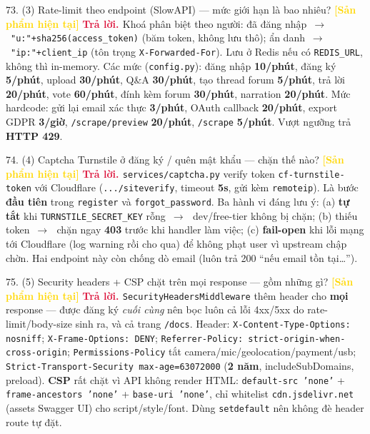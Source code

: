 \documentclass[11pt]{article}
\newcommand{\arr}{\,\ensuremath{\rightarrow}\,}
\newcommand{\tagSP}{\textcolor{gold}{\footnotesize\textbf{[Sản phẩm hiện tại]}}}
\newcommand{\A}{\textbf{\textcolor{crimson}{Trả lời. }}}
\begin{document}
\begin{qa}{73. (3) Rate-limit theo endpoint (SlowAPI) --- mức giới hạn là bao nhiêu? \tagSP}
\A Khoá phân biệt theo người: đã đăng nhập \arr\ \texttt{"u:"+sha256(access\_token)} (băm token, không lưu thô); ẩn danh \arr\ \texttt{"ip:"+client\_ip} (tôn trọng \texttt{X-Forwarded-For}). Lưu ở Redis nếu có \texttt{REDIS\_URL}, không thì in-memory. Các mức (\texttt{config.py}): đăng nhập \textbf{10/phút}, đăng ký \textbf{5/phút}, upload \textbf{30/phút}, Q\&A \textbf{30/phút}, tạo thread forum \textbf{5/phút}, trả lời \textbf{20/phút}, vote \textbf{60/phút}, đính kèm forum \textbf{30/phút}, narration \textbf{20/phút}. Mức hardcode: gửi lại email xác thực \textbf{3/phút}, OAuth callback \textbf{20/phút}, export GDPR \textbf{3/giờ}, \texttt{/scrape/preview} \textbf{20/phút}, \texttt{/scrape} \textbf{5/phút}. Vượt ngưỡng trả \textbf{HTTP 429}.
\end{qa}

\begin{qa}{74. (4) Captcha Turnstile ở đăng ký / quên mật khẩu --- chặn thế nào? \tagSP}
\A \texttt{services/captcha.py} verify token \texttt{cf-turnstile-token} với Cloudflare (\texttt{.../siteverify}, timeout \textbf{5s}, gửi kèm \texttt{remoteip}). Là bước \textbf{đầu tiên} trong \texttt{register} và \texttt{forgot\_password}. Ba hành vi đáng lưu ý: (a) \textbf{tự tắt} khi \texttt{TURNSTILE\_SECRET\_KEY} rỗng \arr\ dev/free-tier không bị chặn; (b) thiếu token \arr\ chặn ngay \textbf{403} trước khi handler làm việc; (c) \textbf{fail-open} khi lỗi mạng tới Cloudflare (log warning rồi cho qua) để không phạt user vì upstream chập chờn. Hai endpoint này còn chống dò email (luôn trả 200 ``nếu email tồn tại\ldots'').
\end{qa}

\begin{qa}{75. (5) Security headers + CSP chặt trên mọi response --- gồm những gì? \tagSP}
\A \texttt{SecurityHeadersMiddleware} thêm header cho \textbf{mọi} response --- được đăng ký \textit{cuối cùng} nên bọc luôn cả lỗi 4xx/5xx do rate-limit/body-size sinh ra, và cả trang \texttt{/docs}. Header: \texttt{X-Content-Type-Options: nosniff}; \texttt{X-Frame-Options: DENY}; \texttt{Referrer-Policy: strict-origin-when-cross-origin}; \texttt{Permissions-Policy} tắt camera/mic/geolocation/payment/usb; \texttt{Strict-Transport-Security max-age=63072000} (\textbf{2 năm}, includeSubDomains, preload). \textbf{CSP} rất chặt vì API không render HTML: \texttt{default-src 'none'} + \texttt{frame-ancestors 'none'} + \texttt{base-uri 'none'}, chỉ whitelist \texttt{cdn.jsdelivr.net} (assets Swagger UI) cho script/style/font. Dùng \texttt{setdefault} nên không đè header route tự đặt.
\end{qa}
\end{document}
